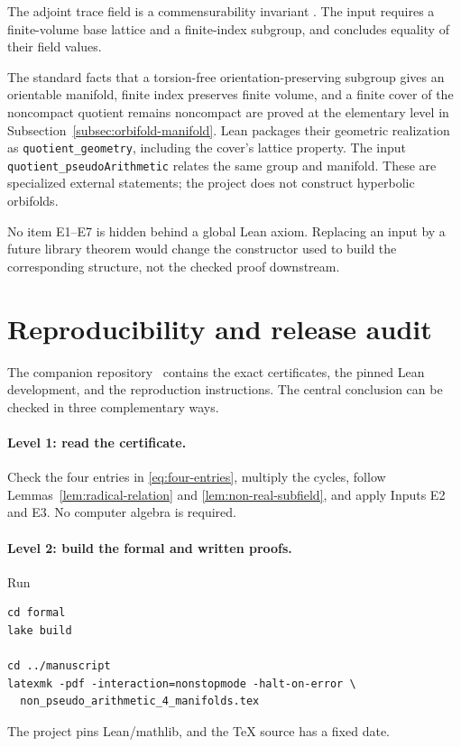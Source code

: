 \documentclass[11pt]{article}
\numberwithin{equation}{section}
\theoremstyle{definition}
\theoremstyle{remark}
\newcommand{\code}[1]{\texttt{#1}}
\begin{document}
\begin{description}[style=nextline]
\item[\textbf{E6: Finite-index trace-field invariance.}]
The adjoint trace field is a commensurability invariant
\cite{VinbergRings}.  The input  requires
a finite-volume base lattice and a finite-index subgroup, and concludes
equality of their field values.

\item[\textbf{E7: Finite-cover quotient geometry.}]
The standard facts that a torsion-free orientation-preserving subgroup gives
an orientable manifold, finite index preserves finite volume, and a finite
cover of the noncompact quotient remains noncompact are proved at the
elementary level in Subsection~\ref{subsec:orbifold-manifold}.  Lean packages
their geometric realization as \code{quotient\_geometry}, including the
cover's lattice property.  The input \code{quotient\_pseudoArithmetic}
relates the same group and manifold.  These are specialized external
statements; the project does not construct hyperbolic orbifolds.
\end{description}

No item E1--E7 is hidden behind a global Lean axiom.  Replacing an input by a
future library theorem would change the constructor used to build the
corresponding structure, not the checked proof downstream.

\section{Reproducibility and release audit}
\label{sec:reproducibility}

The companion repository~\cite{Repository} contains the exact certificates,
the pinned Lean development, and the reproduction instructions.  The central
conclusion can be checked in three complementary ways.

\paragraph{Level 1: read the certificate.}
Check the four entries in \eqref{eq:four-entries}, multiply the cycles,
follow Lemmas~\ref{lem:radical-relation} and
\ref{lem:non-real-subfield}, and apply Inputs E2 and E3.  No computer algebra
is required.

\paragraph{Level 2: build the formal and written proofs.}
Run
\begin{verbatim}
cd formal
lake build

cd ../manuscript
latexmk -pdf -interaction=nonstopmode -halt-on-error \
  non_pseudo_arithmetic_4_manifolds.tex
\end{verbatim}
The project pins Lean/mathlib, and the TeX source has a fixed date.
\end{document}
